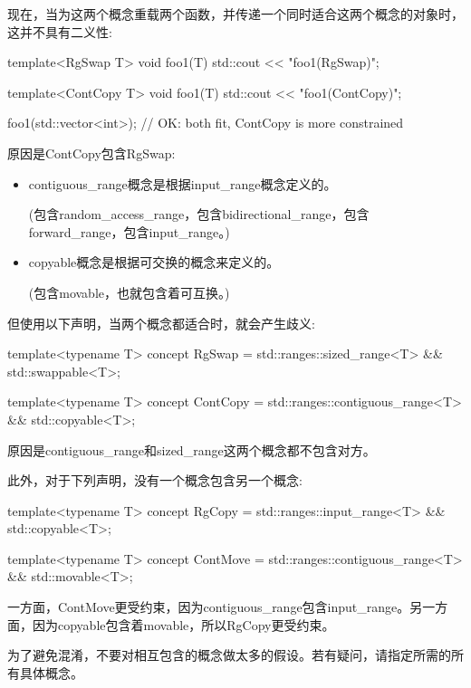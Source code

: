 现在，当为这两个概念重载两个函数，并传递一个同时适合这两个概念的对象时，这并不具有二义性:

\begin{cpp}
template<RgSwap T>
void foo1(T) {
	std::cout << "foo1(RgSwap)\n";
}

template<ContCopy T>
void foo1(T) {
	std::cout << "foo1(ContCopy)\n";
}

foo1(std::vector<int>{}); // OK: both fit, ContCopy is more constrained
\end{cpp}

原因是ContCopy包含RgSwap:

\begin{itemize}
\item
contiguous\_range概念是根据input\_range概念定义的。

(包含random\_access\_range，包含bidirectional\_range，包含forward\_range，包含input\_range。)

\item
copyable概念是根据可交换的概念来定义的。

(包含movable，也就包含着可互换。)
\end{itemize}

但使用以下声明，当两个概念都适合时，就会产生歧义:

\begin{cpp}
template<typename T>
concept RgSwap = std::ranges::sized_range<T> && std::swappable<T>;

template<typename T>
concept ContCopy = std::ranges::contiguous_range<T> && std::copyable<T>;
\end{cpp}

原因是contiguous\_range和sized\_range这两个概念都不包含对方。

此外，对于下列声明，没有一个概念包含另一个概念:

\begin{cpp}
template<typename T>
concept RgCopy = std::ranges::input_range<T> && std::copyable<T>;

template<typename T>
concept ContMove = std::ranges::contiguous_range<T> && std::movable<T>;
\end{cpp}

一方面，ContMove更受约束，因为contiguous\_range包含input\_range。另一方面，因为copyable包含着movable，所以RgCopy更受约束。

为了避免混淆，不要对相互包含的概念做太多的假设。若有疑问，请指定所需的所有具体概念。


